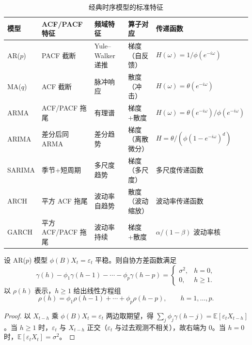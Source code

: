 \begin{table}[htbp]
    \centering
    \caption{经典时序模型的标准特征}
    \label{tab:ts_classical_correspondence}
    \begin{tabular}{>{\centering\arraybackslash}p{2.2cm}>{\centering\arraybackslash}p{2.5cm}>{\centering\arraybackslash}p{2.5cm}>{\centering\arraybackslash}p{2.5cm}>{\centering\arraybackslash}p{3cm}}
        \toprule
        模型 & ACF/PACF 特征 & 频域特征 & 算子对应 & 传递函数 \\
        \midrule
        AR($p$) & PACF 截断 & Yule--Walker 递推 & 梯度（自反馈） & $H(\omega) = 1/\phi(e^{-i\omega})$ \\
        MA($q$) & ACF 截断 & 脉冲响应 & 散度（冲击） & $H(\omega) = \theta(e^{-i\omega})$ \\
        ARMA & ACF/PACF 拖尾 & 有理谱 & 梯度+散度 & $H(\omega) = \theta(e^{-i\omega})/\phi(e^{-i\omega})$ \\
        ARIMA & 差分后同 ARMA & 差分趋势 & 梯度（离散微分） & $H = \theta/(\phi(1-e^{-i\omega})^d)$ \\
        SARIMA & 季节+短周期 & 多尺度趋势 & 梯度（多尺度） & 多尺度传递函数 \\
        ARCH & 平方 ACF 拖尾 & 波动率自趋势 & 散度（波动缩放） & 波动率传递函数 \\
        GARCH & 平方 ACF/PACF 拖尾 & 波动率持续 & 梯度+散度 & $\alpha/(1-\beta)$ 波动率核 \\
        \bottomrule
    \end{tabular}
\end{table}

\begin{theorem}\label{thm:ts_yule_walker}
设 AR($p$) 模型 $\phi(B)X_t=\varepsilon_t$ 平稳。则自协方差函数满足
\[
\gamma(h)-\phi_1\gamma(h-1)-\cdots-\phi_p\gamma(h-p)=\begin{cases}\sigma^2,&h=0,\\0,&h\ge1.\end{cases}
\]
以 $\rho(h)$ 表示，$h\ge1$ 给出线性方程组
\[
\rho(h)=\phi_1\rho(h-1)+\cdots+\phi_p\rho(h-p),\qquad h=1,\dots,p.
\]
\end{theorem}

\begin{proof}
以 $X_{t-h}$ 乘 $\phi(B)X_t=\varepsilon_t$ 两边取期望，得 $\sum_j\phi_j\gamma(h-j)=\mathbb{E}[\varepsilon_tX_{t-h}]$。当 $h\ge1$ 时，$\varepsilon_t$ 与 $X_{t-h}$ 正交（$\varepsilon_t$ 与过去观测不相关），故右端为 $0$。当 $h=0$ 时，$\mathbb{E}[\varepsilon_tX_t]=\sigma^2$。
\end{proof}

